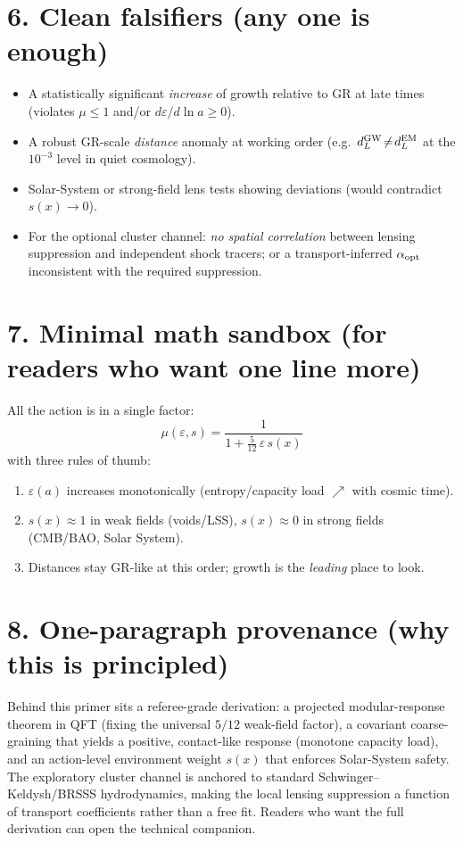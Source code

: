 \documentclass[aps,prd,onecolumn,superscriptaddress,nofootinbib]{revtex4-2}
\newcommand{\eps}{\varepsilon}
\begin{document}
\section*{6. Clean falsifiers (any one is enough)}
\begin{itemize}
\item A statistically significant \emph{increase} of growth relative to GR at late times (violates $\mu\le 1$ and/or $d\eps/d\ln a\ge 0$).
\item A robust GR-scale \emph{distance} anomaly at working order (e.g.\ $d_L^{\rm GW}\!\neq\!d_L^{\rm EM}$ at the $10^{-3}$ level in quiet cosmology).
\item Solar-System or strong-field lens tests showing deviations (would contradict $s(x)\!\to\!0$).
\item For the optional cluster channel: \emph{no spatial correlation} between lensing suppression and independent shock tracers; or a transport-inferred $\alpha_{\rm opt}$ inconsistent with the required suppression.
\end{itemize}

\section*{7. Minimal math sandbox (for readers who want one line more)}
All the action is in a single factor:
\[
\boxed{\quad \mu(\eps,s)=\frac{1}{1+\frac{5}{12}\,\eps\,s(x)} \quad}
\]
with three rules of thumb:
\begin{enumerate}
\item $\eps(a)$ increases monotonically (entropy/capacity load $\nearrow$ with cosmic time).
\item $s(x)\approx 1$ in weak fields (voids/LSS), $s(x)\approx 0$ in strong fields (CMB/BAO, Solar System).
\item Distances stay GR-like at this order; growth is the \emph{leading} place to look.
\end{enumerate}

\section*{8. One-paragraph provenance (why this is principled)}
Behind this primer sits a referee-grade derivation: a projected modular-response theorem in QFT (fixing the universal $5/12$ weak-field factor), a covariant coarse-graining that yields a positive, contact-like response (monotone capacity load), and an action-level environment weight $s(x)$ that enforces Solar-System safety. The exploratory cluster channel is anchored to standard Schwinger–Keldysh/BRSSS hydrodynamics, making the local lensing suppression a function of transport coefficients rather than a free fit. Readers who want the full derivation can open the technical companion.
\end{document}
